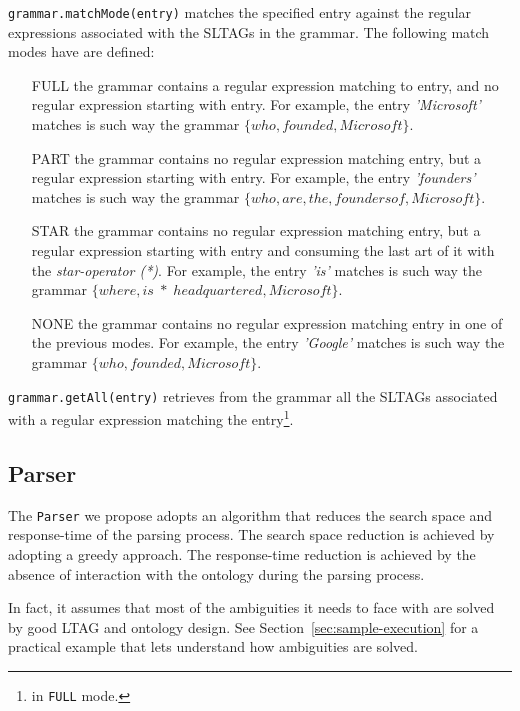 \texttt{grammar.matchMode(entry)} matches the specified entry against the regular expressions associated with the SLTAGs in the grammar. 
%
The following match modes have are defined:
%
\begin{itemize}
	\item[FULL] the grammar contains a regular expression matching to entry, and no regular expression starting with entry. 
	For example, the entry \textit{'Microsoft'} matches is such way the grammar $\{who,founded,Microsoft\}$.
	
	\item[PART] the grammar contains no regular expression matching entry, but a regular expression starting with entry.
	For example, the entry \textit{'founders'} matches is such way the grammar $\{who,are,the,founders of,Microsoft\}$.
	
	\item[STAR] the grammar contains no regular expression matching entry, but a regular expression starting with entry and consuming the last art of it with the \textit{star-operator (*)}.
	For example, the entry \textit{'is'} matches is such way the grammar $\{where,is\;*\;headquartered,Microsoft\}$.

	\item[NONE] the grammar contains no regular expression matching entry in one of the previous modes.
	For example, the entry \textit{'Google'} matches is such way the grammar $\{who,founded,Microsoft\}$.
\end{itemize}

\texttt{grammar.getAll(entry)} retrieves from the grammar all the SLTAGs associated with a regular expression matching the entry\footnote{in \texttt{FULL} mode.}.


\subsection{Parser}
\label{sec:parsing-parser}
The \texttt{Parser} we propose adopts an algorithm that reduces the search space and response-time of the parsing process.
%
The search space reduction is achieved by adopting a greedy approach.
%
The response-time reduction is achieved by the absence of interaction with the ontology during the parsing process.
%

In fact, it assumes that most of the ambiguities it needs to face with are solved by good LTAG and ontology design. 
%
See Section~\ref{sec:sample-execution} for a practical example that lets understand how ambiguities are solved.


